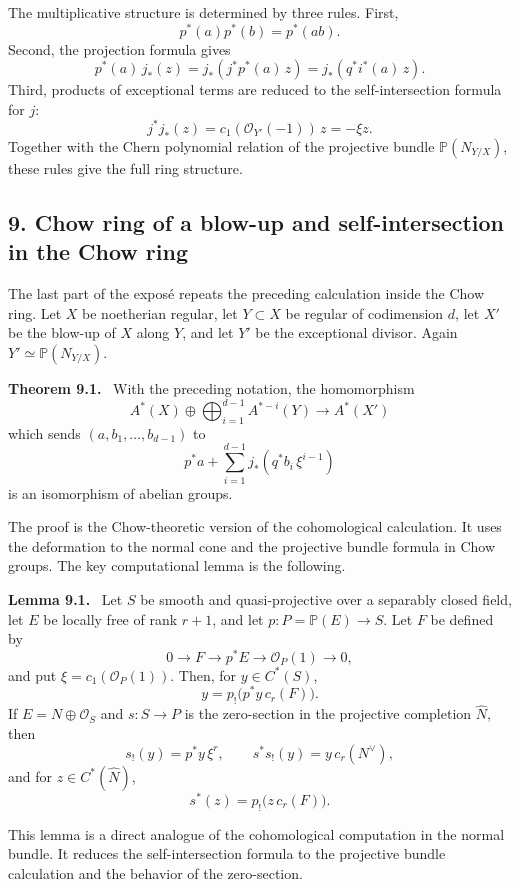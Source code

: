 \documentclass[14pt]{extarticle}
\newcommand{\cO}{\mathcal O}
\newenvironment{statement}[1]{\par\medskip\noindent\textbf{#1.}\ }{\par\medskip}
\begin{document}
The multiplicative structure is determined by three rules. First,
\[
   p^*(a)p^*(b)=p^*(ab).
\]
Second, the projection formula gives
\[
   p^*(a)\,j_*(z)=j_*(j^*p^*(a)\,z)=j_*(q^*i^*(a)\,z).
\]
Third, products of exceptional terms are reduced to the self-intersection formula for $j$:
\[
   j^*j_*(z)=c_1(\cO_{Y'}(-1))\,z=-\xi z.
\]
Together with the Chern polynomial relation of the projective bundle $\mathbb P(N_{Y/X})$, these rules give the full ring structure.

\subsection*{9. Chow ring of a blow-up and self-intersection in the Chow ring}

The last part of the expos\'e repeats the preceding calculation inside the Chow ring. Let $X$ be noetherian regular, let $Y\subset X$ be regular of codimension $d$, let $X'$ be the blow-up of $X$ along $Y$, and let $Y'$ be the exceptional divisor. Again $Y'\simeq\mathbb P(N_{Y/X})$.

\begin{statement}{Theorem 9.1}
With the preceding notation, the homomorphism
\[
   A^*(X)\oplus \bigoplus_{i=1}^{d-1}A^{*-i}(Y)\longrightarrow A^*(X')
\]
which sends $(a,b_1,\ldots,b_{d-1})$ to
\[
   p^*a+\sum_{i=1}^{d-1}j_*(q^*b_i\,\xi^{i-1})
\]
is an isomorphism of abelian groups.
\end{statement}

The proof is the Chow-theoretic version of the cohomological calculation. It uses the deformation to the normal cone and the projective bundle formula in Chow groups. The key computational lemma is the following.

\begin{statement}{Lemma 9.1}
Let $S$ be smooth and quasi-projective over a separably closed field, let $E$ be locally free of rank $r+1$, and let $p:P=\mathbb P(E)\to S$. Let $F$ be defined by
\[
   0\to F\to p^*E\to\cO_P(1)\to0,
\]
and put $\xi=c_1(\cO_P(1))$. Then, for $y\in C^*(S)$,
\[
   y=p_!\bigl(p^*y\,c_r(F)\bigr).
\]
If $E=N\oplus\cO_S$ and $s:S\to P$ is the zero-section in the projective completion $\widehat N$, then
\[
   s_!(y)=p^*y\,\xi^r,
   \qquad
   s^*s_!(y)=y\,c_r(N^\vee),
\]
and for $z\in C^*(\widehat N)$,
\[
   s^*(z)=p_!\bigl(z\,c_r(F)\bigr).
\]
\end{statement}

This lemma is a direct analogue of the cohomological computation in the normal bundle. It reduces the self-intersection formula to the projective bundle calculation and the behavior of the zero-section.
\end{document}
